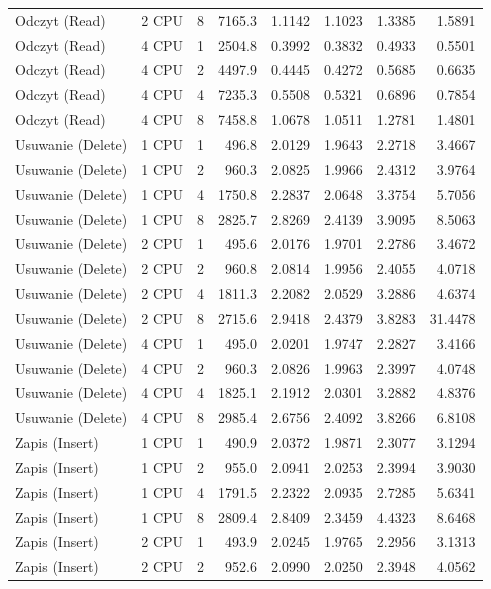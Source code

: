 \begin{table}[ht]
{\begin{tabular}{llcrrrrr}
Odczyt (Read) & 2 CPU & 8 & 7165.3 & 1.1142 & 1.1023 & 1.3385 & 1.5891 \\
Odczyt (Read) & 4 CPU & 1 & 2504.8 & 0.3992 & 0.3832 & 0.4933 & 0.5501 \\
Odczyt (Read) & 4 CPU & 2 & 4497.9 & 0.4445 & 0.4272 & 0.5685 & 0.6635 \\
Odczyt (Read) & 4 CPU & 4 & 7235.3 & 0.5508 & 0.5321 & 0.6896 & 0.7854 \\
Odczyt (Read) & 4 CPU & 8 & 7458.8 & 1.0678 & 1.0511 & 1.2781 & 1.4801 \\
Usuwanie (Delete) & 1 CPU & 1 & 496.8 & 2.0129 & 1.9643 & 2.2718 & 3.4667 \\
Usuwanie (Delete) & 1 CPU & 2 & 960.3 & 2.0825 & 1.9966 & 2.4312 & 3.9764 \\
Usuwanie (Delete) & 1 CPU & 4 & 1750.8 & 2.2837 & 2.0648 & 3.3754 & 5.7056 \\
Usuwanie (Delete) & 1 CPU & 8 & 2825.7 & 2.8269 & 2.4139 & 3.9095 & 8.5063 \\
Usuwanie (Delete) & 2 CPU & 1 & 495.6 & 2.0176 & 1.9701 & 2.2786 & 3.4672 \\
Usuwanie (Delete) & 2 CPU & 2 & 960.8 & 2.0814 & 1.9956 & 2.4055 & 4.0718 \\
Usuwanie (Delete) & 2 CPU & 4 & 1811.3 & 2.2082 & 2.0529 & 3.2886 & 4.6374 \\
Usuwanie (Delete) & 2 CPU & 8 & 2715.6 & 2.9418 & 2.4379 & 3.8283 & 31.4478 \\
Usuwanie (Delete) & 4 CPU & 1 & 495.0 & 2.0201 & 1.9747 & 2.2827 & 3.4166 \\
Usuwanie (Delete) & 4 CPU & 2 & 960.3 & 2.0826 & 1.9963 & 2.3997 & 4.0748 \\
Usuwanie (Delete) & 4 CPU & 4 & 1825.1 & 2.1912 & 2.0301 & 3.2882 & 4.8376 \\
Usuwanie (Delete) & 4 CPU & 8 & 2985.4 & 2.6756 & 2.4092 & 3.8266 & 6.8108 \\
Zapis (Insert) & 1 CPU & 1 & 490.9 & 2.0372 & 1.9871 & 2.3077 & 3.1294 \\
Zapis (Insert) & 1 CPU & 2 & 955.0 & 2.0941 & 2.0253 & 2.3994 & 3.9030 \\
Zapis (Insert) & 1 CPU & 4 & 1791.5 & 2.2322 & 2.0935 & 2.7285 & 5.6341 \\
Zapis (Insert) & 1 CPU & 8 & 2809.4 & 2.8409 & 2.3459 & 4.4323 & 8.6468 \\
Zapis (Insert) & 2 CPU & 1 & 493.9 & 2.0245 & 1.9765 & 2.2956 & 3.1313 \\
Zapis (Insert) & 2 CPU & 2 & 952.6 & 2.0990 & 2.0250 & 2.3948 & 4.0562 \\

\end{tabular}}
\end{table}
